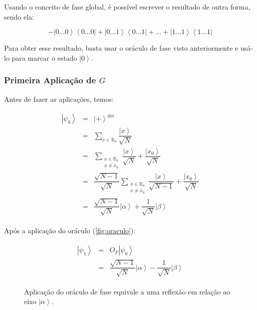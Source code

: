 Usando o conceito de fase global, é possível escrever o resultado de
outra forma, sendo ela:

\[-\left| 0\dots 0 \right\rangle \left\langle 0 \dots 0 \right| + \left| 0 \dots 1 \right\rangle \left\langle 0 \dots 1 \right| + \dots + \left| 1 \dots 1\right\rangle \left\langle 1 \dots 1 \right|\]

Para obter esse resultado, basta usar o oráculo de fase visto
anteriormente e usá-lo para marcar o estado \(\left| 0 \right\rangle\).

\subsubsection{Primeira Aplicação de $G$}\label{subsubsec:primeira-aplicacao-de-g}

Antes de fazer as aplicações, temos:

\[\begin{aligned}
\begin{matrix}
\left| \psi_0 \right\rangle &=& \left| + \right\rangle^{\otimes n} \\
&=& \sum_{x \in \mathbb{B}_n} \dfrac{\left| x \right\rangle}{\sqrt{N}} \\
&=& \sum_{\substack{x \in \mathbb{B}_n \\ x \ne x_0}}\dfrac{\left| x \right\rangle}{\sqrt{N}} + \dfrac{\left| x_0 \right\rangle}{\sqrt{N}} \\
&=& \dfrac{\sqrt{N - 1}}{\sqrt{N}}\sum_{\substack{x \in \mathbb{B}_n \\ x \ne x_0}}\dfrac{\left| x \right\rangle}{\sqrt{N - 1}} + \dfrac{\left| x_0 \right\rangle}{\sqrt{N}} \\
&=& \dfrac{\sqrt{N - 1}}{\sqrt{N}} \left| \alpha \right\rangle + \dfrac{1}{\sqrt{N}} \left| \beta \right\rangle
\end{matrix}
\end{aligned}\]

Após a aplicação do oráculo (\autoref{fig:oraculo}):

\[\begin{aligned}
\begin{matrix}
\left| \psi_1 \right\rangle &=& O_F \left| \psi_0 \right\rangle \\
&=& \dfrac{\sqrt{N - 1}}{\sqrt{N}} \left| \alpha \right\rangle - \dfrac{1}{\sqrt{N}} \left| \beta \right\rangle
\end{matrix}
\end{aligned}\]

\begin{figure}[!htb]
  \centering
  
  \caption{Aplicação do oráculo de fase equivale a uma reflexão em relação ao eixo \(\left| \alpha \right\rangle\)\cite{giovani}.}
  \label{fig:oraculo}
\end{figure}

